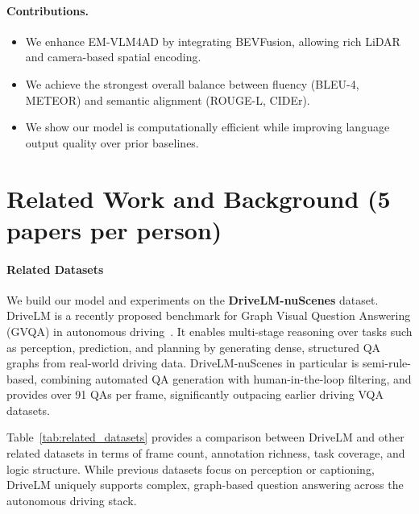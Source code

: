 \documentclass{article} %
\begin{document}
\paragraph{Contributions.}
\begin{itemize}
    \item We enhance EM-VLM4AD by integrating BEVFusion, allowing rich LiDAR and camera-based spatial encoding.
    \item We achieve the strongest overall balance between fluency (BLEU-4, METEOR) and semantic alignment (ROUGE-L, CIDEr).
    \item We show our model is computationally efficient while improving language output quality over prior baselines.
\end{itemize}


\clearpage


\section{ Related Work and Background (5 papers per person)}
\paragraph{Related Datasets} 
We build our model and experiments on the \textbf{DriveLM-nuScenes} dataset. DriveLM is a recently proposed benchmark for Graph Visual Question Answering (GVQA) in autonomous driving~\cite{sima2025drivelmdrivinggraphvisual}. It enables multi-stage reasoning over tasks such as perception, prediction, and planning by generating dense, structured QA graphs from real-world driving data. DriveLM-nuScenes in particular is semi-rule-based, combining automated QA generation with human-in-the-loop filtering, and provides over 91 QAs per frame, significantly outpacing earlier driving VQA datasets. 

Table~\ref{tab:related_datasets} provides a comparison between DriveLM and other related datasets in terms of frame count, annotation richness, task coverage, and logic structure. While previous datasets focus on perception or captioning, DriveLM uniquely supports complex, graph-based question answering across the autonomous driving stack.
\end{document}
